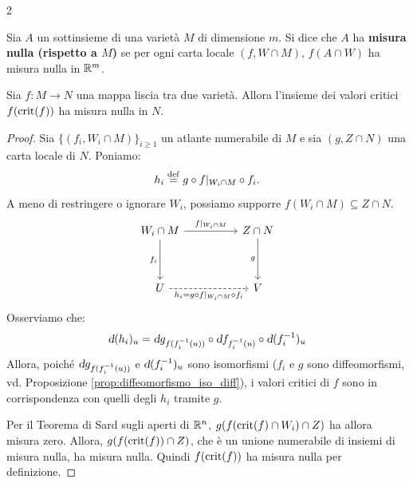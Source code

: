 \begin{multicols*}{2}
    \begin{definition}
        Sia $A$ un sottinsieme di una varietà $M$ di dimensione $m$.
        Si dice che
        $A$ ha \textbf{misura nulla (rispetto a $M$)} se per ogni
        carta locale $(f, W \cap M)$, $f(A \cap W)$ ha misura nulla
        in $\mathbb{R}^m$.
    \end{definition}

    \begin{theorem} \label{thm:sard}
        Sia $f : M \to N$ una
        mappa liscia tra due varietà. Allora l'insieme dei valori
        critici $f(\operatorname{crit}(f))$ ha misura nulla in $N$.
    \end{theorem}

    \begin{proof}
        Sia $\{(f_i, W_i \cap M)\}_{i \geq 1}$ un atlante numerabile di $M$ e
        sia $(g, Z \cap N)$ una carta locale di $N$. Poniamo:
        \[
            h_i \overset{\mathrm{def}}{=} g \circ f\arrowvert_{W_i \cap M} \circ f_i.
        \]
        A meno di restringere o ignorare $W_i$, possiamo
        supporre $f(W_i \cap M) \subseteq Z \cap N$.
        \[\begin{tikzcd}
                {W_i \cap M} && {Z \cap N} \\
                \\
                U && V
                \arrow["{\restr{f}{W_i \cap M}}", from=1-1, to=1-3]
                \arrow["{f_i}"', from=1-1, to=3-1]
                \arrow["g"', from=1-3, to=3-3]
                \arrow["{h_i = g \circ \restr{f}{W_i \cap M} \circ f_i}"', dashed, from=3-1, to=3-3]
            \end{tikzcd}\]
        Osserviamo che:
        \[
            \dif (h_i)_u = \dif g_{f(f_i\inv(u))} \circ \dif f_{f_i\inv(u)} \circ \dif (f_i\inv)_u
        \]
        Allora, poiché $\dif g_{f(f_i\inv(u))}$ e $\dif (f_i\inv)_u$ sono isomorfismi
        ($f_i$ e $g$ sono diffeomorfismi, vd. Proposizione \ref{prop:diffeomorfismo_iso_diff}),
        i valori critici di $f$ sono in corrispondenza con quelli degli $h_i$ tramite $g$. \medskip

        Per il Teorema di Sard sugli aperti di $\mathbb{R}^n$, $g(f(\operatorname{crit}(f) \cap W_i) \cap Z)$ ha allora
        misura zero. Allora, $g(f(\operatorname{crit}(f)) \cap Z)$, che è un unione numerabile di insiemi di misura
        nulla, ha misura nulla. Quindi $f(\operatorname{crit}(f))$ ha misura nulla per definizione.
    \end{proof}


\end{multicols*}
